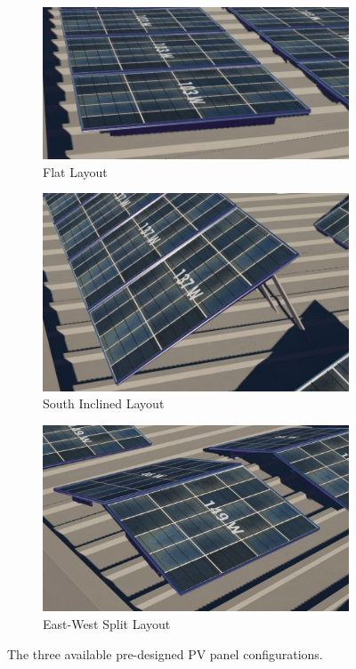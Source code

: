 \documentclass[draft, final]{vutinfth} %
\begin{document}
\begin{figure}
    \centering
    \begin{subfigure}[b]{0.32\textwidth}
        \includegraphics[width=\textwidth]{graphics/layout-flat.jpg}
        \caption{Flat Layout}
        \label{fig:flat-layout}
    \end{subfigure}
    \hfill
    \begin{subfigure}[b]{0.32\textwidth}
        \includegraphics[width=\textwidth]{graphics/layout-south.jpg}
        \caption{South Inclined Layout}
        \label{fig:south-layout}
    \end{subfigure}
    \hfill
    \begin{subfigure}[b]{0.32\textwidth}
        \includegraphics[width=\textwidth]{graphics/layout-eastwest.jpg}
        \caption{East-West Split Layout}
        \label{fig:east-west-layout}
    \end{subfigure}
    \caption{The three available pre-designed PV panel configurations.}
    \label{fig:pv-configurations}
\end{figure}
\end{document}
